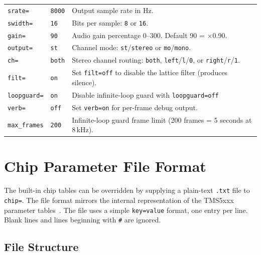\documentclass[10pt]{article}
\begin{document}
\begin{center}
\begin{tabular}{p{2.8cm}p{2.1cm}>{\raggedright\arraybackslash}p{7.4cm}}
\texttt{srate=}     & \texttt{8000}  & Output sample rate in Hz. \\
\texttt{swidth=}    & \texttt{16}    & Bits per sample: \texttt{8} or \texttt{16}. \\
\texttt{gain=}      & \texttt{90}    & Audio gain percentage 0--300.
                               Default 90 = $\times$0.90. \\
\texttt{output=}    & \texttt{st}    & Channel mode: \texttt{st}/\texttt{stereo}
                               or \texttt{mo}/\texttt{mono}. \\
\texttt{ch=}        & \texttt{both}  & Stereo channel routing: \texttt{both},
                               \texttt{left}/\texttt{l}/\texttt{0},
                               or \texttt{right}/\texttt{r}/\texttt{1}. \\
\texttt{filt=}      & \texttt{on}    & Set \texttt{filt=off} to disable the
                               lattice filter (produces silence). \\
\texttt{loopguard=} & \texttt{on}    & Disable infinite-loop guard with \texttt{loopguard=off} \\
\texttt{verb=}      & \texttt{off}   & Set \texttt{verb=on} for per-frame
                               debug output. \\
\texttt{max\_frames}& \texttt{200}   & Infinite-loop guard frame limit
                               (200 frames = 5 seconds at 8\,kHz). \\
\bottomrule
\end{tabular}
\end{center}

\clearpage
\section{Chip Parameter File Format}
\label{app:chipfile}

The built-in chip tables can be overridden by supplying a plain-text
\texttt{.txt} file to \texttt{chip=}.  The file format mirrors the internal
representation of the TMS5xxx parameter tables~\cite{TMS5220_1983,TMS5100_1981}.  The file uses a simple
\texttt{key=value} format, one entry per line.  Blank lines and lines
beginning with \texttt{\#} are ignored.

\subsection{File Structure}
\end{document}
